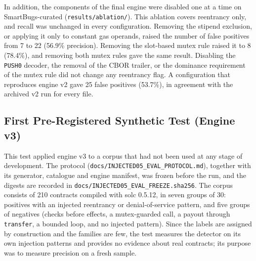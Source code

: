 \documentclass[pdflatex,sn-mathphys]{sn-jnl}
\theoremstyle{thmstyletwo}
\theoremstyle{thmstyletwo}
\begin{document}
\begin{table}[t]
\centering
\small
\caption{Reentrancy (SWC-107) precision and FPR (\%) for engine v2 (no stipend bound), v3 (stipend bound) and v5 (final engine) on the three real benchmarks. All figures are post hoc. Recall is the same for the three versions on each benchmark.}
\label{tab:correction}
\end{table}

In addition, the components of the final engine were disabled one at a time on SmartBugs-curated (\texttt{results/ablation/}). This ablation covers reentrancy only, and recall was unchanged in every configuration. Removing the stipend exclusion, or applying it only to constant gas operands, raised the number of false positives from 7 to 22 (56.9\% precision). Removing the slot-based mutex rule raised it to 8 (78.4\%), and removing both mutex rules gave the same result. Disabling the \texttt{PUSH0} decoder, the removal of the CBOR trailer, or the dominance requirement of the mutex rule did not change any reentrancy flag. A configuration that reproduces engine v2 gave 25 false positives (53.7\%), in agreement with the archived v2 run for every file.

\subsection{First Pre-Registered Synthetic Test (Engine v3)}\label{sec:results:fresh}
This test applied engine v3 to a corpus that had not been used at any stage of development. The protocol (\texttt{docs/INJECTED05\_EVAL\_PROTOCOL.md}), together with its generator, catalogue and engine manifest, was frozen before the run, and the digests are recorded in \texttt{docs/INJECTED05\_EVAL\_FREEZE.sha256}. The corpus consists of 210 contracts compiled with solc 0.5.12, in seven groups of 30: positives with an injected reentrancy or denial-of-service pattern, and five groups of negatives (checks before effects, a mutex-guarded call, a payout through \texttt{transfer}, a bounded loop, and no injected pattern). Since the labels are assigned by construction and the families are few, the test measures the detector on its own injection patterns and provides no evidence about real contracts; its purpose was to measure precision on a fresh sample.
\end{document}
